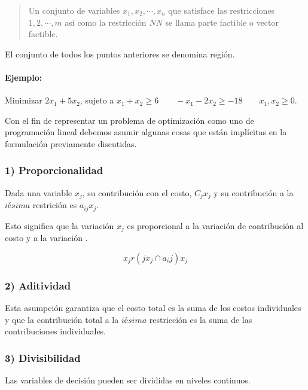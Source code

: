\documentclass[]{article}
\let\oldparagraph\paragraph
\renewcommand{\paragraph}[1]{\oldparagraph{#1}\mbox{}}
\begin{document}
\begin{quote}
Un conjunto de variables \(x_1, x_2, \cdots, x_n\) que satisface las
restricciones \(1,2,\cdots,m\) así como la restricción \(NN\) se llama
parte factible o vector factible.
\end{quote}

El conjunto de todos los puntos anteriores se denomina región.

\hypertarget{ejemplo-1}{%
\paragraph{Ejemplo: }\label{ejemplo-1}}

Minimizar \(2x_1+5x_2\), sujeto a
\(x_1+x_2\ge 6 \qquad -x_1-2x_2 \ge -18 \qquad x_1,x_2 \ge 0\).

Con el fin de representar un problema de optimización como uno de
programación lineal debemos asumir algunas cosas que están implícitas en
la formulación previamente discutidas.

\hypertarget{1-proporcionalidad}{%
\subsubsection{1) Proporcionalidad}\label{1-proporcionalidad}}

Dada una variable \(x_j\), su contribución con el costo, \(C_jx_j\) y su
contribución a la \(iésima\) restrición es \(a_{ij}x_j\).

Esto significa que la variación \(x_j\) es proporcional a la variación
de contribución al costo y a la variación .

\[x_j r (jx_j\cap a_ij)x_j\]

\hypertarget{2-aditividad}{%
\subsubsection{2) Aditividad}\label{2-aditividad}}

Esta asumpción garantiza que el costo total es la suma de los costos
individuales y que la contribución total a la \(iésima\) restricción es
la suma de las contribuciones individuales.

\hypertarget{3-divisibilidad}{%
\subsubsection{3) Divisibilidad}\label{3-divisibilidad}}

Las variables de decisión pueden ser divididas en niveles continuos.
\end{document}
